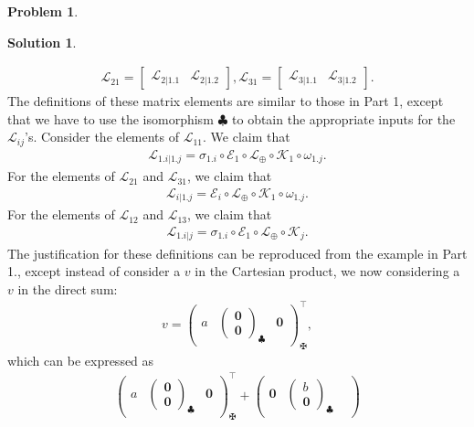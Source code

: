 \documentclass{book}
\theoremstyle{definition}
\newtheorem*{prob*}{Problem}
\newtheorem*{sln*}{Solution}
\newcommand{\lag}{\mathcal{L}}
\newcommand{\K}{\mathcal{K}}
\newcommand{\E}{\mathcal{E}}
\begin{document}
\begin{prob*}
\begin{sln*}
\begin{enumerate}
\begin{align*}
		\lag_{21} = \begin{bmatrix}
		\lag_{2|1.1}&\lag_{2|1.2}
		\end{bmatrix}, \lag_{31} = \begin{bmatrix}
		\lag_{3|1.1}&\lag_{3|1.2}
		\end{bmatrix}.
		\end{align*}
		The definitions of these matrix elements are similar to those in Part 1, except that we have to use the isomorphism $\clubsuit$ to obtain the appropriate inputs for the $\lag_{ij}$'s. Consider the elements of $\lag_{11}$. We claim that
		\begin{align*}
		\lag_{1.i|1.j} = \sigma_{1.i} \circ \E_1 \circ \lag_\oplus \circ \K_1 \circ \omega_{1.j}.
		\end{align*}
		For the elements of $\lag_{21}$ and $\lag_{31}$, we claim that
		\begin{align*}
		\lag_{i|1.j} = \E_i \circ \lag_\oplus \circ \K_{1} \circ \omega_{1.j}.
		\end{align*}
		For the elements of $\lag_{12}$ and $\lag_{13}$, we claim that
		\begin{align*}
		\lag_{1.i|j} = \sigma_{1.i} \circ \E_1 \circ \lag_\oplus \circ \K_j.
		\end{align*}
		The justification for these definitions can be reproduced from the example in Part 1., except instead of consider a $v$ in the Cartesian product, we now considering a $v$ in the direct sum:
		\begin{align*}
		v = 
		\begin{pmatrix}
		a & \begin{pmatrix}
		\mathbf{0}\\\mathbf{0}
		\end{pmatrix}_\clubsuit&
		\mathbf{0}
		\end{pmatrix}^\top_\maltese,
		\end{align*}
		which can be expressed as
		\begin{align*}
		\begin{pmatrix}
		a & \begin{pmatrix}
		\mathbf{0}\\\mathbf{0}
		\end{pmatrix}_\clubsuit&
		\mathbf{0}
		\end{pmatrix}^\top_\maltese
		+
		\begin{pmatrix}
		\mathbf{0} & \begin{pmatrix}
		b\\\mathbf{0}
		\end{pmatrix}_\clubsuit&

\end{pmatrix}
\end{align*}
\end{enumerate}
\end{sln*}
\end{prob*}
\end{document}
